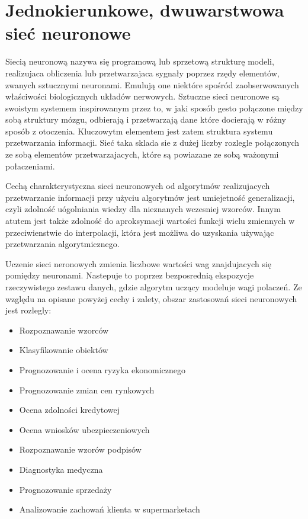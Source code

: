\documentclass[brudnopis]{xmgr}
\begin{document}
\section{Jednokierunkowe, dwuwarstwowa sieć neuronowe}

Siecią neuronową nazywa się programową lub sprzetową strukturę modeli, realizujaca obliczenia lub przetwarzajaca sygnały poprzez rzędy elementów, zwanych sztucznymi neuronami. Emulują one niektóre spośród zaobserwowanych właściwości biologicznych układów nerwowych. Sztuczne sieci neuronowe są swoistym systemem inspirowanym przez to, w jaki sposób gesto połączone między sobą struktury mózgu, odbierają i przetwarzają dane które docierają w różny sposób z otoczenia. Kluczowytm elementem jest zatem struktura systemu przetwarzania informacji. Sieć taka sklada sie z dużej liczby rozlegle połączonych ze sobą elementów przetwarzajacych, które są powiazane ze sobą ważonymi połaczeniami.

Cechą charakterystyczna sieci neuronowych od algorytmów realizujacych przetwarzanie informacji przy użyciu algorytmów jest umiejetność generalizacji, czyli zdolność uógolniania wiedzy dla nieznanych wczesniej wzorców. Innym atutem jest także zdolność do aproksymacji wartości funkcji wielu zmiennych w przeciwienstwie do interpolacji, która jest możliwa do uzyskania używając przetwarzania algorytmicznego.

Uczenie sieci neronowych zmienia liczbowe wartości wag znajdujacych się pomiędzy neuronami. Nastepuje to poprzez bezposrednią ekspozycje rzeczywistego zestawu danych, gdzie algorytm uczący modeluje wagi polaczeń. Ze względu na opisane powyżej cechy i zalety, obszar zastosowań sieci neuronowych jest rozlegly:

\begin{itemize}
\item
Rozpoznawanie wzorców
\item
Klasyfikowanie obiektów
\item
Prognozowanie i ocena ryzyka ekonomicznego
\item
Prognozowanie zmian cen rynkowych
\item
Ocena zdolności kredytowej
\item
Ocena wniosków ubezpieczeniowych
\item
Rozpoznawanie wzorów podpisów
\item
Diagnostyka medyczna
\item
Prognozowanie sprzedaży
\item
Analizowanie zachowań klienta w supermarketach
\end{itemize}
\end{document}
